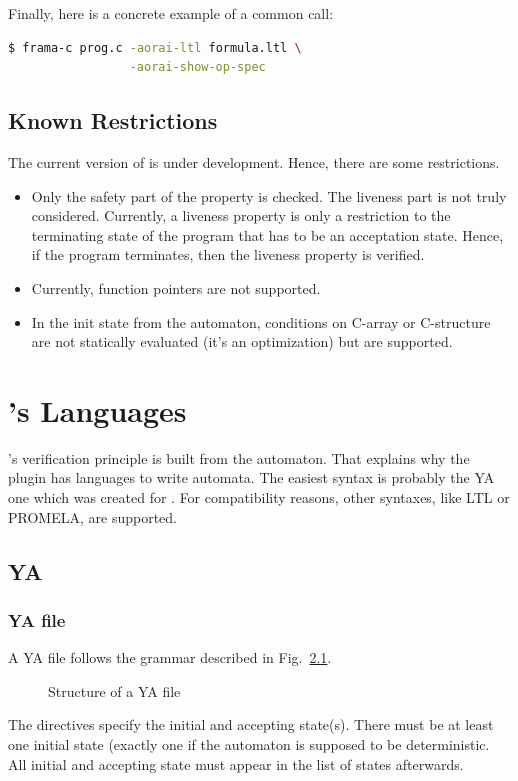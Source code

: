 \documentclass{report}
\begin{document}
  Finally, here is a concrete example of a common call:

\begin{lstlisting}[language=sh]
$ frama-c prog.c -aorai-ltl formula.ltl \
                 -aorai-show-op-spec
\end{lstlisting} %

\section{Known Restrictions}

The current version of \aorai is under development. Hence, there are
some restrictions.
\begin{itemize}
\item Only the safety part of the property is checked. The liveness
  part is not truly considered. Currently, a liveness property is only
  a restriction to the terminating state of the program that has to
  be an acceptation state. Hence, if the program terminates, then the
  liveness property is verified.
  \item Currently, function pointers are not supported.
  \item In the init state from the automaton, conditions on C-array or
    C-structure are not statically evaluated (it's an optimization)
    but are supported.
\end{itemize}


\chapter{\aorai's Languages}
\aorai's verification principle is built from the
automaton. That explains why the plugin has languages to write automata.  The
easiest syntax is probably the YA one which was created for \aorai.
For compatibility reasons, other syntaxes, like LTL or PROMELA, are supported.

\section{YA}
\label{sec:ya}
\lstset{language=ya}
\subsection{YA file}\label{sec:ya-file}
A YA file follows the grammar described in Fig.~\ref{ya-file}.
\begin{figure}[htb]

\caption{Structure of a YA file}\label{ya-file}
\end{figure}
The directives specify the initial and accepting state(s). There must be at
least one initial state (exactly one if the automaton is supposed to be
deterministic. All initial and accepting state must appear in the list of
states afterwards.
\end{document}
